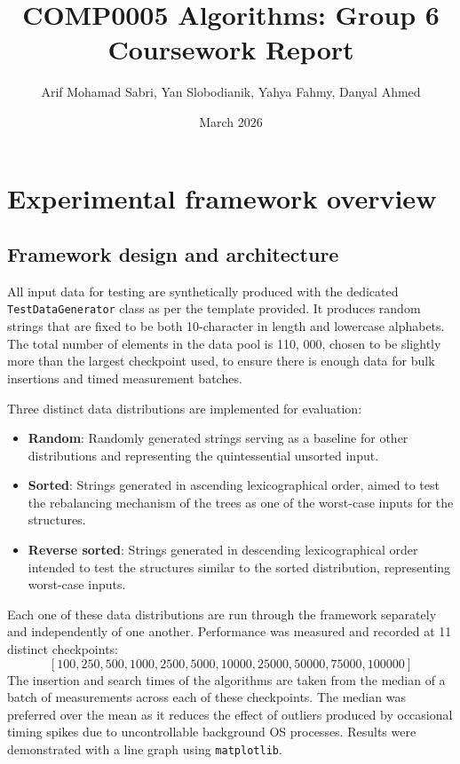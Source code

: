 \documentclass[12pt]{article}
\begin{document}
\title{COMP0005 Algorithms: Group 6 Coursework Report}
\author{Arif Mohamad Sabri, Yan Slobodianik, Yahya Fahmy, Danyal Ahmed}
\date{March 2026}
\maketitle

\section{Experimental framework overview}

\subsection{Framework design and architecture}

All input data for testing are synthetically produced with the dedicated \texttt{TestDataGenerator} class as per the template provided. It produces random strings that are fixed to be both 10-character in length and lowercase alphabets. The total number of elements in the data pool is 110, 000, chosen to be slightly more than the largest checkpoint used, to ensure there is enough data for bulk insertions and timed measurement batches.

Three distinct data distributions are implemented for evaluation:

\begin{itemize}
    \item \textbf{Random}: Randomly generated strings serving as a baseline for other distributions and representing the quintessential unsorted input.
 
    \item \textbf{Sorted}: Strings generated in ascending lexicographical order, aimed to test the rebalancing mechanism of the trees as one of the worst-case inputs for the structures.
 
    \item \textbf{Reverse sorted}: Strings generated in descending lexicographical order intended to test the structures similar to the sorted distribution, representing worst-case inputs.
\end{itemize}
Each one of these data distributions are run through the framework separately and independently of one another.
Performance was measured and recorded at 11 distinct checkpoints:
\[
    [100, 250, 500, 1000, 2500, 5000, 10000, 25000, 50000, 75000, 100000]
\]
The insertion and search times of the algorithms are taken from the median of a batch of measurements across each of these checkpoints. The median was preferred over the mean as it reduces the effect of outliers produced by occasional timing spikes due to uncontrollable background OS processes. Results were demonstrated with a line graph using \texttt{matplotlib}.
\end{document}
